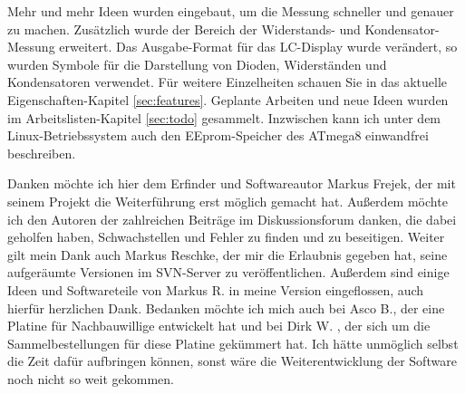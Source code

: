 Mehr und mehr Ideen wurden eingebaut, um die Messung schneller und genauer zu machen.
Zusätzlich wurde der Bereich der Widerstands- und Kondensator-Messung erweitert.
Das Ausgabe-Format für das LC-Display wurde verändert, so wurden Symbole für die Darstellung von
Dioden, Widerständen und Kondensatoren verwendet.
Für weitere Einzelheiten schauen Sie in das aktuelle Eigenschaften-Kapitel \ref{sec:features}.
Geplante Arbeiten und neue Ideen wurden im Arbeitslisten-Kapitel \ref{sec:todo} gesammelt.
Inzwischen kann ich unter dem Linux-Betriebssystem auch den EEprom-Speicher des ATmega8 einwandfrei beschreiben.

Danken möchte ich hier dem Erfinder und Softwareautor Markus Frejek, der mit seinem Projekt die Weiterführung erst
möglich gemacht hat.
Außerdem möchte ich den Autoren der zahlreichen Beiträge im Diskussionsforum danken, die dabei geholfen haben, Schwachstellen und
Fehler zu finden und zu beseitigen. 
Weiter gilt mein Dank auch Markus Reschke, der mir die Erlaubnis gegeben hat, seine aufgeräumte Versionen im
SVN-Server zu veröffentlichen. Außerdem sind einige Ideen und Softwareteile von Markus R. in meine Version eingeflossen,
auch hierfür herzlichen Dank.
Bedanken möchte ich mich auch bei Asco B., der eine Platine für Nachbauwillige entwickelt hat und bei Dirk W. , der sich
um die Sammelbestellungen für diese Platine gekümmert hat. Ich hätte unmöglich selbst die Zeit dafür aufbringen können, sonst
wäre die Weiterentwicklung der Software noch nicht so weit gekommen.

